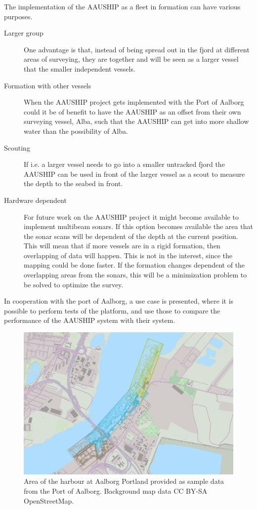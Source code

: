 The implementation of the AAUSHIP as a fleet in formation can have various purposes.
\begin{description}
\item[Larger group] One advantage is that, instead of being spread out in the fjord at different areas of surveying, they are together and will be seen as a larger vessel that the smaller independent vessels.
\item[Formation with other vessels] When the AAUSHIP project gets implemented with the Port of Aalborg could it be of benefit to have the AAUSHIP as an offset from their own surveying vessel, Alba, such that the AAUSHIP can get into more shallow water than the possibility of Alba.
\item[Scouting] If i.e. a larger vessel needs to go into a smaller untracked fjord the AAUSHIP can be used in front of the larger vessel as a scout to measure the depth to the seabed in front.
\item[Hardware dependent] For future work on the AAUSHIP project it might become available to implement multibeam sonars. If this option becomes available the area that the sonar scans will be dependent of the depth at the current position. This will mean that if more vessels are in a rigid formation, then overlapping of data will happen. This is not in the interest, since the mapping could be done faster. If the formation changes dependent of the overlapping areas from the sonars, this will be a minimization problem to be solved to optimize the survey.
\end{description}

In cooperation with the port of Aalborg, a use case is presented, where it is possible to perform tests of the platform, and use those to compare the performance of the AAUSHIP system with their system.
\begin{figure}[htbp]
	\centering
	\includegraphics[width=\textwidth]{fig/use-case-data}
	\caption{Area of the harbour at Aalborg Portland provided as sample
	data from the Port of Aalborg. Background map data CC BY-SA OpenStreetMap.}
	\label{fig:diffforms}
\end{figure}


